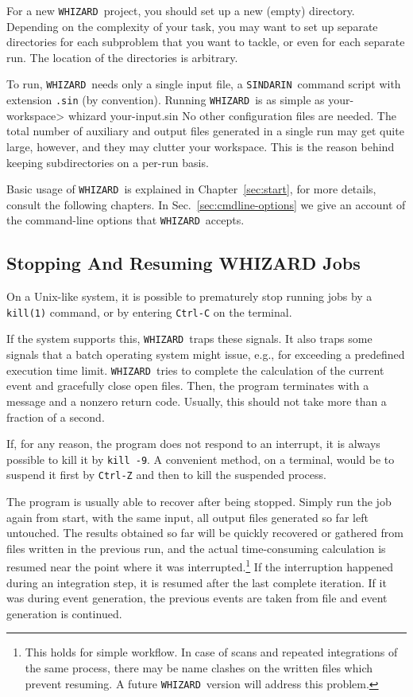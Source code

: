 \documentclass[12pt]{book}
\newenvironment{interaction}%
  {\begingroup\small
   \verbatim}%
  {\endverbatim
   \endgroup\noindent}
\newcommand{\ttt}[1]{\texttt{#1}}
\newcommand{\whizard}{\texttt{WHIZARD}}
\newcommand{\sindarin}{\texttt{SINDARIN}}
\begin{document}
For a new \whizard\ project, you should set up a new (empty)
directory.  Depending on the complexity of your task, you may want to
set up separate directories for each subproblem that you want to
tackle, or even for each separate run.  The location of the
directories is arbitrary.

To run, \whizard\ needs only a single input file, a \sindarin\ command
script with extension \ttt{.sin} (by convention).  Running
\whizard\ is as simple as
\begin{interaction}
  your-workspace> whizard your-input.sin
\end{interaction}
No other configuration files are needed.  The total number of
auxiliary and output files generated in a single run may get quite
large, however, and they may clutter your workspace.  This is the
reason behind keeping subdirectories on a per-run basis.

Basic usage of \whizard\ is explained in Chapter~\ref{sec:start}, for
more details, consult the following chapters.  In
Sec.~\ref{sec:cmdline-options} we give an account of the command-line
options that \whizard\ accepts.


\subsection{Stopping And Resuming WHIZARD Jobs}

On a Unix-like system, it is possible to prematurely stop running jobs
by a \ttt{kill(1)} command, or by entering \ttt{Ctrl-C} on the
terminal.

If the system supports this, \whizard\ traps these signals.  It also
traps some signals that a batch operating system might issue, e.g.,
for exceeding a predefined execution time limit.  \whizard\ tries to
complete the calculation of the current event and gracefully close
open files.  Then, the program terminates with a message and a nonzero
return code.  Usually, this should not take more than a fraction of a
second.

If, for any reason, the program does not respond to an interrupt, it
is always possible to kill it by \ttt{kill -9}.  A convenient method,
on a terminal, would be to suspend it first by \ttt{Ctrl-Z} and then
to kill the suspended process.

The program is usually able to recover after being stopped.  Simply
run the job again from start, with the same input, all output files
generated so far left untouched.  The results obtained so far will be
quickly recovered or gathered from files written in the previous run,
and the actual time-consuming calculation is resumed near the point
where it was interrupted.\footnote{This holds for simple workflow.  In
  case of scans and repeated integrations of the same process, there
  may be name clashes on the written files which prevent resuming.  A
  future \whizard\ version will address this problem.}  If the
interruption happened during an integration step, it is resumed after
the last complete iteration.  If it was during event generation, the
previous events are taken from file and event generation is continued.
\end{document}
